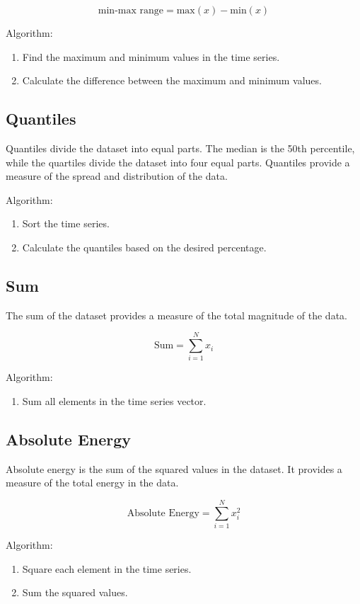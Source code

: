 \begin{equation}
    \text{min-max range} = \text{max}(x) - \text{min}(x)
    \label{eq:min_max_range}
\end{equation}

Algorithm:
\begin{enumerate}
    \item Find the maximum and minimum values in the time series.
    \item Calculate the difference between the maximum and minimum values.
\end{enumerate}

\subsection{Quantiles}
Quantiles divide the dataset into equal parts. The median is the 50th percentile, while the quartiles divide the dataset into four equal parts. Quantiles provide a measure of the spread and distribution of the data.

Algorithm:
\begin{enumerate}
    \item Sort the time series.
    \item Calculate the quantiles based on the desired percentage.
\end{enumerate}

\subsection{Sum}
The sum of the dataset provides a measure of the total magnitude of the data.

\begin{equation}
    \text{Sum} = \sum_{i=1}^{N} x_i
    \label{eq:sum}
\end{equation}

Algorithm:
\begin{enumerate}
    \item Sum all elements in the time series vector.
\end{enumerate}

\subsection{Absolute Energy}
Absolute energy is the sum of the squared values in the dataset. It provides a measure of the total energy in the data.

\begin{equation}
    \text{Absolute Energy} = \sum_{i=1}^{N} x_i^2
    \label{eq:absolute_energy}
\end{equation}

Algorithm:
\begin{enumerate}
    \item Square each element in the time series.
    \item Sum the squared values.
\end{enumerate}





